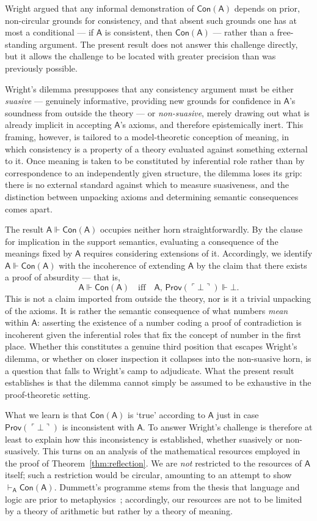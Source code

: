 \documentclass[reqno]{asl}
\newcommand{\pa}{\textsf{A}}
\newcommand{\Prov}{\textsf{Prov}}
\newcommand{\Con}{\textsf{Con}}
\begin{document}
Wright argued that any informal demonstration of $\Con(\pa)$ depends on prior,
non-circular grounds for consistency, and that absent such grounds one has at
most a conditional --- if $\pa$ is consistent, then $\Con(\pa)$ --- rather than a
free-standing argument. The present result does not answer this challenge
directly, but it allows the challenge to be located with greater precision than
was previously possible.

Wright's dilemma presupposes that any consistency argument must be either
\emph{suasive} --- genuinely informative, providing new grounds for confidence in
$\pa$'s soundness from outside the theory --- or \emph{non-suasive}, merely
drawing out what is already implicit in accepting $\pa$'s axioms, and therefore
epistemically inert. This framing, however, is tailored to a model-theoretic
conception of meaning, in which consistency is a property of a theory evaluated
against something external to it. Once meaning is taken to be constituted by
inferential role rather than by correspondence to an independently given
structure, the dilemma loses its grip: there is no external standard against
which to measure suasiveness, and the distinction between unpacking axioms and
determining semantic consequences comes apart.

The result $\pa \Vdash \Con(\pa)$ occupies neither horn straightforwardly. By
the clause for implication in the support semantics, evaluating a consequence
of the meanings fixed by $\pa$ requires considering extensions of
it. Accordingly, we identify $\pa \Vdash \Con(\pa)$ with the
incoherence of extending $\pa$ by the claim that there exists a proof of
absurdity --- that is,
\[
  \pa \Vdash \Con(\pa) \quad \text{iff} \quad \pa,\, \Prov(\ulcorner \bot
  \urcorner) \Vdash \bot.
\]
This is not a claim imported from outside the theory, nor is it a trivial
unpacking of the axioms. It is rather the semantic consequence of what numbers
\emph{mean} within $\pa$: asserting the existence of a number coding a proof of
contradiction is incoherent given the inferential roles that fix the concept of
number in the first place. Whether this constitutes a genuine third position
that escapes Wright's dilemma, or whether on closer inspection it collapses
into the non-suasive horn, is a question that falls to Wright's camp to
adjudicate. What the present result establishes is that the dilemma cannot
simply be assumed to be exhaustive in the proof-theoretic setting.

What we learn is that $\Con(\pa)$ is `true' according to $\pa$ just in case 
$\Prov(\ulcorner \bot\urcorner)$ is inconsistent with $\pa$. To answer 
Wright's challenge is therefore at least to explain how this inconsistency is 
established, whether suasively or non-suasively. This turns on an analysis of 
the mathematical resources employed in the proof of 
Theorem~\ref{thm:reflection}. We are \emph{not} restricted to the resources 
of $\pa$ itself; such a restriction would be circular, amounting to an attempt 
to show $\vdash_{\pa} \Con(\pa)$. Dummett's programme stems from the thesis 
that language and logic are prior to 
metaphysics~\cite{dummett1991logicalbasis}; accordingly, our resources are not to be limited by a theory of arithmetic but rather by a theory of meaning. 
\end{document}
